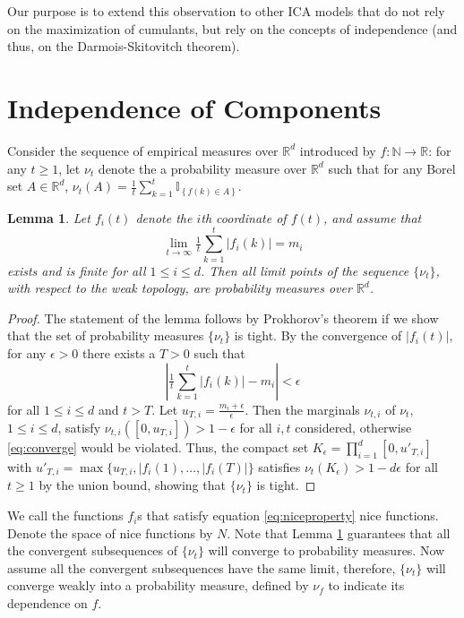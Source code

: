\documentclass[english]{article} %
\providecommand{\lemmaname}{Lemma}
\newcommand{\ind}[1]{\mathbb{I}_{\left\{ #1 \right\}}}
\newcommand{\real}{\mathbb{R}}
\renewcommand{\natural}{\mathbb{N}}
\providecommand{\lemmaname}{Lemma}
\theoremstyle{plain}
\theoremstyle{remark}
\theoremstyle{claim}
\theoremstyle{plain}
\newtheorem{lemma}[thm]{\protect\lemmaname}
\begin{document}
Our purpose is to extend this observation to other ICA models that do not rely on the maximization of cumulants, but rely on the concepts of independence (and thus, on the Darmois-Skitovitch theorem).

\section{Independence of Components}
\label{sec:IndeofComp}
Consider the sequence of empirical measures over $\real^d$ introduced by $f:\natural \rightarrow \real$: for any $t\ge 1$, let $\nu_t$ denote the a probability measure over $\real^d$ such that
for any Borel set $A \in \real^d$, $\nu_t(A)=\tfrac{1}{t} \sum_{k=1}^t \ind{f(k) \in A}$. 
\begin{lemma}
\label{lem:nicefunction}
Let $f_i(t)$ denote the $i$th coordinate of $f(t)$, and assume that
\begin{equation}
\label{eq:niceproperty}
\lim_{t\to\infty} \tfrac{1}{t}\sum_{k=1}^t |f_i(k)|=m_i
\end{equation}
exists and is finite for all $1 \le i \le d$.
Then all limit points of the sequence $\{\nu_t\}$, with respect to the weak topology, are probability measures over $\real^d$.
\end{lemma}
\begin{proof}
The statement of the lemma follows by Prokhorov's theorem if we show that the set of probability measures $\{\nu_t\}$ is tight.
By the convergence of $|f_i(t)|$, for any $\epsilon>0$ there exists a $T>0$ such that
\begin{equation}
\label{eq:converge}
\left| \tfrac{1}{t} \sum_{k=1}^t |f_i(k)| - m_i \right| <\epsilon
\end{equation}
for all $1 \le i \le d$ and $t>T$. Let $u_{T,i}=\tfrac{m_i+\epsilon}{\epsilon}$. Then the marginals
$\nu_{t,i}$ of $\nu_t$, $1\le i \le d$, satisfy $\nu_{t,i}([0,u_{T,i}]) > 1-\epsilon$ for all $i,t$ considered, otherwise \eqref{eq:converge} would be violated. Thus, the compact set
$K_{\epsilon}=\prod_{i=1}^d [0,u'_{T,i}]$ with $u'_{T,i}=\max\{u_{T,i},|f_i(1),\ldots,|f_i(T)|\}$ satisfies
$\nu_t(K_{\epsilon})>1-d \epsilon$ for all $t \ge 1$ by the union bound, showing that $\{\nu_t\}$ is tight.
\end{proof}

We call the functions $f_i$s that satisfy equation \eqref{eq:niceproperty} nice functions. Denote the space of nice functions by $N$. 
Note that Lemma \ref{lem:nicefunction} guarantees that all the convergent subsequences of $\{\nu_t\}$ will converge to probability measures. 
Now assume all the convergent subsequences have the same limit, therefore, $\{\nu_t\}$ will converge weakly into a probability measure, defined by $\nu_f$ to indicate its dependence on $f$. 
\end{document}
